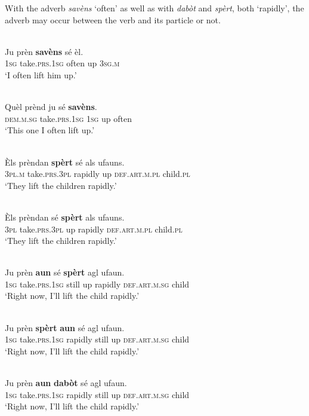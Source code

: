 With the adverb \textit{savèns} `often' as well as with \textit{dabòt} and \textit{spèrt}, both `rapidly', the adverb may occur between the verb and its particle or not.

\ea
\label{ex:pv:10}
\\
\gll    Ju prèn \textbf{savèns} sé èl.\\
     \textsc{1sg} take.\textsc{prs.1sg} often up \textsc{3sg.m}\\
\glt `I often lift him up.'
\z

\ea
\label{ex:pv:11}
\\
\gll    Quèl prènd ju sé \textbf{savèns}.\\
     \textsc{dem.m.sg} take.\textsc{prs.1sg} \textsc{1sg} up often\\
\glt `This one I often lift up.'
\z

\ea
\label{ex:pv:12}
\\
\gll Èls prèndan \textbf{spèrt} sé als ufauns.   \\
\textsc{3pl.m} take.\textsc{prs.3pl} rapidly up \textsc{def.art.m.pl} child.\textsc{pl}  \\
\glt `They lift the children rapidly.'
\z

\ea
\label{ex:pv:13}
\\
\gll Èls prèndan sé \textbf{spèrt} als ufauns.   \\
   \textsc{3pl} take.\textsc{prs.3pl} up rapidly \textsc{def.art.m.pl} child.\textsc{pl}  \\
\glt `They lift the children rapidly.'
\z

\ea
\label{ex:pv:14}
\\
\gll Ju prèn \textbf{aun} sé \textbf{spèrt} agl ufaun.    \\
    \textsc{1sg} take.\textsc{prs.1sg} still up rapidly \textsc{def.art.m.sg} child \\
\glt `Right now, I’ll lift the child rapidly.'
\z

\ea
\label{ex:pv:15}
\\
\gll Ju prèn \textbf{spèrt} \textbf{aun} sé agl ufaun.    \\
    \textsc{1sg} take.\textsc{prs.1sg} rapidly still up \textsc{def.art.m.sg} child \\
\glt `Right now, I’ll lift the child rapidly.'
\z

\ea
\label{ex:pv:16}
\\
\gll Ju prèn \textbf{aun} \textbf{dabòt} sé agl ufaun.    \\
    \textsc{1sg} take.\textsc{prs.1sg} rapidly still up \textsc{def.art.m.sg} child \\
\glt `Right now, I’ll lift the child rapidly.'
\z


